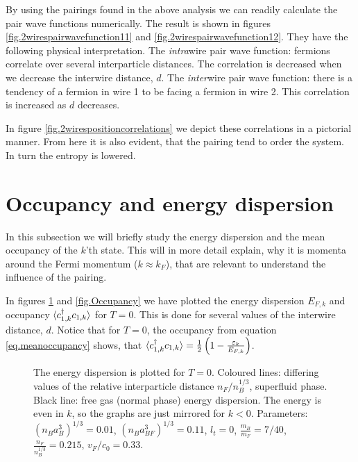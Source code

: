 By using the pairings found in the above analysis we can readily calculate the pair wave functions numerically. The result is shown in figures \ref{fig.2wirespairwavefunction11} and \ref{fig.2wirespairwavefunction12}. They have the following physical interpretation. The \textit{intra}wire pair wave function: fermions correlate over several interparticle distances. The correlation is decreased when we decrease the interwire distance, $d$. The \textit{inter}wire pair wave function: there is a tendency of a fermion in wire 1 to be facing a fermion in wire 2. This correlation is increased as $d$ decreases. 

In figure \ref{fig.2wirespositioncorrelations} we depict these correlations in a pictorial manner. From here it is also evident, that the pairing tend to order the system. In turn the entropy is lowered. 

\section{Occupancy and energy dispersion}
\label{sec.Occupancy.energydispersion}
In this subsection we will briefly study the energy dispersion and the mean occupancy of the $k$'th state. This will in more detail explain, why it is momenta around the Fermi momentum ($k \approx k_F$), that are relevant to understand the influence of the pairing.  

In figures \ref{fig.EnergyDispersion} and \ref{fig.Occupancy} we have plotted the energy dispersion $E_{F,k}$ and occupancy $\braket{c_{1,k}^\dagger c_{1,k}}$ for $T = 0$. This is done for several values of the interwire distance, $d$. Notice that for $T = 0$, the occupancy from equation \eqref{eq.meanoccupancy} shows, that $\braket{c_{1,k}^\dagger c_{1,k}} = \frac{1}{2}\left(1 -  \frac{\varepsilon_k}{E_{F,k}}\right)$. 

\begin{figure} 
\begin{center}  
  
\caption{The energy dispersion is plotted for $T = 0$. Coloured lines: differing values of the relative interparticle distance $n_F / n_B^{1/3}$, superfluid phase. Black line: free gas (normal phase) energy dispersion. The energy is even in $k$, so the graphs are just mirrored for $k < 0$. Parameters: $(n_Ba_B^3)^{1/3} = 0.01$, $(n_Ba_{BF}^3)^{1/3} = 0.11$, $l_t = 0$, $\frac{m_B}{m_F} = 7/40$, $\frac{n_F}{n_B^{1/3}} = 0.215$, $v_F/c_0 = 0.33$. }  
\label{fig.EnergyDispersion}  
\end{center}    
\end{figure}


